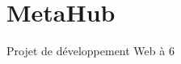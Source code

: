 \chapter{Meta\+Hub}
\hypertarget{md__r_e_a_d_m_e}{}\label{md__r_e_a_d_m_e}
\label{md__r_e_a_d_m_e_autotoc_md0}%
%
 Projet de développement Web à 6 